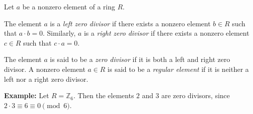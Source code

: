 \documentclass[12pt]{article}
\begin{document}
Let $a$ be a nonzero element of a ring $R$.

The element $a$ is a {\em left zero divisor} if there exists a nonzero element $b \in R$ such that $a \cdot b = 0$.  Similarly, $a$ is a {\em right zero divisor} if there exists a nonzero element $c \in R$ such that $c \cdot a = 0$.

The element $a$ is said to be a {\em zero divisor} if it is both a left and right zero divisor.  A nonzero element $a \in R$ is said to be a {\em regular element} if it is neither a left nor a right zero divisor.

{\bf Example:}
Let $R = \mathbb{Z}_6$.  Then the elements $2$ and $3$ are zero divisors, since $2 \cdot 3 \equiv 6 \equiv 0 \pmod 6$.
\end{document}
